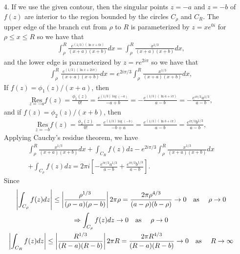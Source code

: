 \documentclass[a4paper,12pt]{article}
\begin{document}
\begin{enumerate}
    \item[4.]
        If we use the given contour, then the singular points $z = -a$ and $z = -b$ of $f(z)$ are interior to the region bounded by the circles $C_\rho$ and $C_R$. The upper edge of the branch cut from $\rho$ to $R$ is parameterized by $z = xe^{0i}$ for $\rho \leq x \leq R$ so we have that
        \begin{align*}
            \int_\rho^R \frac{e^{(1/3)(\ln x + 0i)}}{(x + a)(x + b)} dx = \int_\rho^R \frac{x^{1/3}}{(x + a)(x + b)} dx,
        \end{align*}
        and the lower edge is parameterized by $z = re^{2i\pi}$ so we have that
        \begin{align*}
            \int_\rho^R \frac{e^{(1/3)(\ln x + 2i\pi)}}{(x + a)(x + b)} dx = e^{2i\pi/3} \int_\rho^R \frac{x^{1/3}}{(x + a)(x + b)} dx,
        \end{align*}
        If $f(z) = \phi_1(z) / (x + a)$, then
        \begin{align*}
            \underset{z = -a}{\text{Res}} f(z) = \frac{\phi_1(z)}{0!} = \frac{e^{(1/3) \log(-a)}}{-a + b} = -\frac{e^{(1/3)(\ln a + i\pi)}}{a - b} = -\frac{e^{i\pi/3} a^{1/3}}{a - b},
        \end{align*}
        and if $f(z) = \phi_2(z) / (x + b)$, then
        \begin{align*}
            \underset{z = -b}{\text{Res}} f(z) = \frac{\phi_2(z)}{0!} = \frac{e^{(1/3) \log(-b)}}{-b + a} = \frac{e^{(1/3)(\ln b + i\pi)}}{a - b} = \frac{e^{i\pi/3} b^{1/3}}{a - b},
        \end{align*}
        Applying Cauchy's residue theorem, we have
        \begin{align*}
            \int_\rho^R \frac{x^{1/3}}{(x + a)(x + b)} dx + \int_{C_R} f(z) dz - e^{2i\pi/3} \int_\rho^R \frac{x^{1/3}}{(x + a)(x + b)} dx \\
            + \int_{C_\rho} f(z) dz = 2\pi i \left[ -\frac{e^{i\pi/3} a^{1/3}}{a - b} + \frac{e^{i\pi/3} b^{1/3}}{a - b} \right].
        \end{align*}
        Since
        \begin{gather*}
            \left| \int_{C_\rho} f(z) dz \right| \leq \left| \frac{\rho^{1/3}}{(\rho - a)(\rho - b)} \right| 2\pi \rho = \frac{2\pi \rho^{4/3}}{(a - \rho)(b - \rho)} \to 0 \text{\quad as \quad} \rho \to 0 \\
            \Rightarrow \int_{C_\rho} f(z) dz \to 0 \text{\quad as \quad} \rho \to 0 \\
            \left| \int_{C_R} f(z) dz \right| \leq \left| \frac{R^{1/3}}{(R - a)(R - b)} \right| 2\pi R = \frac{2\pi R^{4/3}}{(R - a)(R - b)} \to 0 \text{\quad as \quad} R \to \infty \\

\end{gather*}
\end{enumerate}
\end{document}
